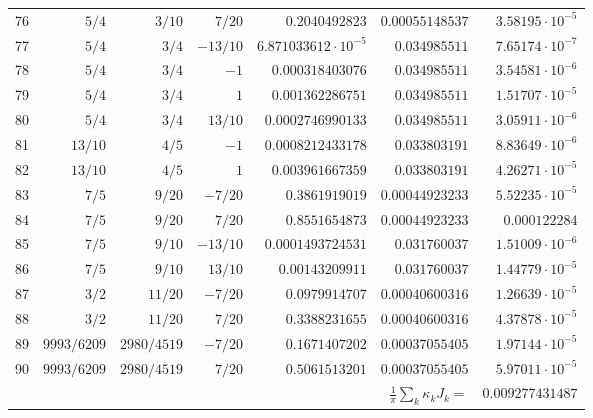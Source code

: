 \documentclass[11pt,reqno]{amsart}
\numberwithin{equation}{section}
\theoremstyle{definition}
\theoremstyle{remark}
\begin{document}
\begin{center}
\begin{longtable}{@{}rrrrrrr@{}}
76 & $5/4$ & $3/10$ & $7/20$ & $0.2040492823$ & $0.00055148537$ & $3.58195\cdot10^{-5}$\\
77 & $5/4$ & $3/4$ & $-13/10$ & $6.871033612\cdot10^{-5}$ & $0.034985511$ & $7.65174\cdot10^{-7}$\\
78 & $5/4$ & $3/4$ & $-1$ & $0.000318403076$ & $0.034985511$ & $3.54581\cdot10^{-6}$\\
79 & $5/4$ & $3/4$ & $1$ & $0.001362286751$ & $0.034985511$ & $1.51707\cdot10^{-5}$\\
80 & $5/4$ & $3/4$ & $13/10$ & $0.0002746990133$ & $0.034985511$ & $3.05911\cdot10^{-6}$\\
81 & $13/10$ & $4/5$ & $-1$ & $0.0008212433178$ & $0.033803191$ & $8.83649\cdot10^{-6}$\\
82 & $13/10$ & $4/5$ & $1$ & $0.003961667359$ & $0.033803191$ & $4.26271\cdot10^{-5}$\\
83 & $7/5$ & $9/20$ & $-7/20$ & $0.3861919019$ & $0.00044923233$ & $5.52235\cdot10^{-5}$\\
84 & $7/5$ & $9/20$ & $7/20$ & $0.8551654873$ & $0.00044923233$ & $0.000122284$\\
85 & $7/5$ & $9/10$ & $-13/10$ & $0.0001493724531$ & $0.031760037$ & $1.51009\cdot10^{-6}$\\
86 & $7/5$ & $9/10$ & $13/10$ & $0.00143209911$ & $0.031760037$ & $1.44779\cdot10^{-5}$\\
87 & $3/2$ & $11/20$ & $-7/20$ & $0.0979914707$ & $0.00040600316$ & $1.26639\cdot10^{-5}$\\
88 & $3/2$ & $11/20$ & $7/20$ & $0.3388231655$ & $0.00040600316$ & $4.37878\cdot10^{-5}$\\
89 & $9993/6209$ & $2980/4519$ & $-7/20$ & $0.1671407202$ & $0.00037055405$ & $1.97144\cdot10^{-5}$\\
90 & $9993/6209$ & $2980/4519$ & $7/20$ & $0.5061513201$ & $0.00037055405$ & $5.97011\cdot10^{-5}$\\
\midrule \multicolumn{6}{r}{$\frac1\pi\sum_k\kappa_kJ_k=$} & $0.009277431487$\\
\end{longtable}
\end{center}
\end{document}
